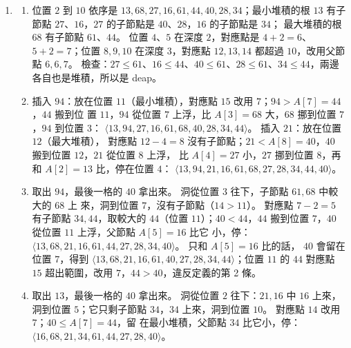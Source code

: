 \begin{enumerate}
\item
\begin{enumerate}
\item 位置 $2$ 到 $10$ 依序是 $13,\allowbreak 68,\allowbreak 27,\allowbreak 16,\allowbreak 61,\allowbreak 44,\allowbreak 40,\allowbreak 28,\allowbreak 34$；最小堆積的根 $13$ 有子節點 $27$、$16$，$27$ 的子節點是 $40$、$28$，$16$ 的子節點是 $34$；
最大堆積的根 $68$ 有子節點 $61$、$44$。 位置 $4$、$5$ 在深度 $2$，對應點是 $4 + 2 = 6$、
$5 + 2 = 7$；位置 $8, 9, 10$ 在深度 $3$，對應點 $12, 13, 14$ 都超過 $10$，改用父節點 $6, 6, 7$。
檢查：$27 \le 61$、$16 \le 44$、$40 \le 61$、$28 \le 61$、$34 \le 44$，兩邊各自也是堆積，所以是
deap。
\item 插入 $94$：放在位置 $11$（最小堆積），對應點 $15$ 改用 $7$；$94 > A[7] = 44$，$44$ 搬到位
置 $11$，$94$ 從位置 $7$ 上浮，比 $A[3] = 68$ 大，$68$ 挪到位置 $7$，$94$ 到位置 $3$：
$\langle 13, 94, 27, 16, 61, 68, 40, 28, 34, 44 \rangle$。 插入 $21$：放在位置 $12$（最大堆積），
對應點 $12 - 4 = 8$ 沒有子節點；$21 < A[8] = 40$，$40$ 搬到位置 $12$，$21$ 從位置 $8$ 上浮，
比 $A[4] = 27$ 小，$27$ 挪到位置 $8$，再和 $A[2] = 13$ 比，停在位置 $4$：
$\langle 13, 94, 21, 16, 61, 68, 27, 28, 34, 44, 40 \rangle$。
\item 取出 $94$，最後一格的 $40$ 拿出來。 洞從位置 $3$ 往下，子節點 $61, 68$ 中較大的 $68$ 上
來，洞到位置 $7$，沒有子節點（$14 > 11$）。 對應點 $7 - 2 = 5$ 有子節點 $34, 44$，取較大的
$44$（位置 $11$）；$40 < 44$，$44$ 搬到位置 $7$，$40$ 從位置 $11$ 上浮，父節點 $A[5] = 16$ 比它
小，停：$\langle 13, 68, 21, 16, 61, 44, 27, 28, 34, 40 \rangle$。 只和 $A[5] = 16$ 比的話，
$40$ 會留在位置 $7$，得到 $\langle 13, 68, 21, 16, 61, 40, 27, 28, 34, 44 \rangle$；位置 $11$ 的
$44$ 對應點 $15$ 超出範圍，改用 $7$，$44 > 40$，違反定義的第 2 條。
\item 取出 $13$，最後一格的 $40$ 拿出來。 洞從位置 $2$ 往下：$21, 16$ 中 $16$ 上來，洞到位置
$5$；它只剩子節點 $34$，$34$ 上來，洞到位置 $10$。 對應點 $14$ 改用 $7$；$40 \le A[7] = 44$，留
在最小堆積，父節點 $34$ 比它小，停：$\langle 16, 68, 21, 34, 61, 44, 27, 28, 40 \rangle$。
\end{enumerate}


\end{enumerate}
